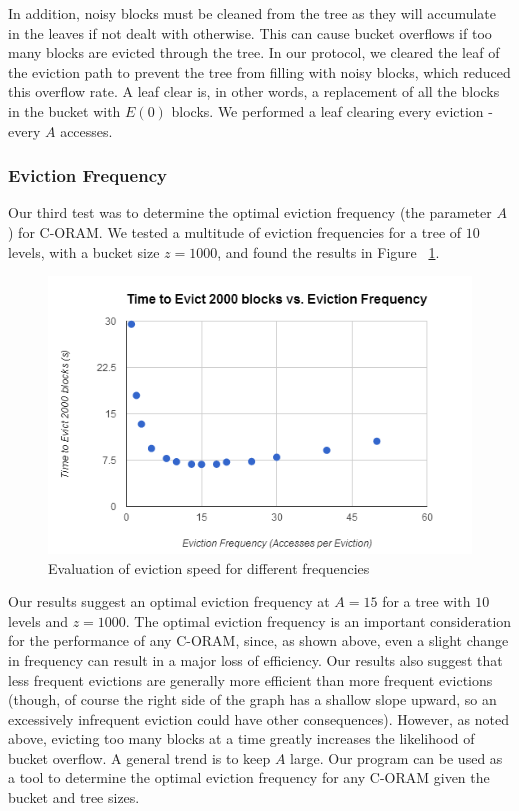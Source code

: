 \documentclass[12pt, oneside]{article}   	%
\begin{document}
In addition, noisy blocks must be cleaned from the tree as they will accumulate in the leaves if not dealt with otherwise. This can cause bucket overflows if too many blocks are evicted through the tree. In our protocol, we cleared the leaf of the eviction path to prevent the tree from filling with noisy blocks, which reduced this overflow rate. A leaf clear is, in other words, a replacement of all the blocks in the bucket with $E (0)$ blocks. We performed a leaf clearing every eviction - every $A$ accesses. 

\subsubsection{Eviction Frequency}
Our third test was to determine the optimal eviction frequency (the parameter $A$) for C-ORAM. We tested a multitude of eviction frequencies for a tree of $10$ levels, with a bucket size $z = 1000$, and found the results in Figure ~\ref{fig:evictionfreqgraph}.

\begin{figure}[H]
  \includegraphics[width=\linewidth]{evictionfreqgraph}
  \caption{Evaluation of eviction speed for different frequencies}
  \label{fig:evictionfreqgraph}
\end{figure}


 Our results suggest an optimal eviction frequency at $A=15$ for a tree with $10$ levels and $z = 1000$. The optimal eviction frequency is an important consideration for the performance of any C-ORAM, since, as shown above, even a slight change in frequency can result in a major loss of efficiency. Our results also suggest that less frequent evictions are generally more efficient than more frequent evictions (though, of course the right side of the graph has a shallow slope upward, so an excessively infrequent eviction could have other consequences). However, as noted above, evicting too many blocks at a time greatly increases the likelihood of bucket overflow. A general trend is to keep $A$ large. Our program can be used as a tool to determine the optimal eviction frequency for any C-ORAM given the bucket and tree sizes.
\end{document}
